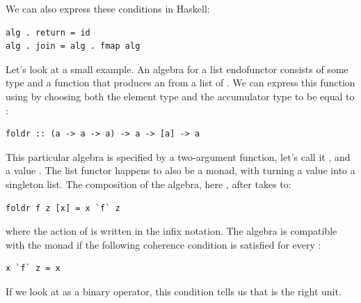 \begin{figure}[H]
  \centering
  \begin{subfigure}
    \centering
  \end{subfigure}
  \hspace{1cm}
  \begin{subfigure}
    \centering
  \end{subfigure}
\end{figure}

\noindent
We can also express these conditions in Haskell:

\begin{Verbatim}
alg . return = id
alg . join = alg . fmap alg
\end{Verbatim}
Let's look at a small example. An algebra for a list endofunctor
consists of some type  and a function that produces an
 from a list of . We can express this function using
 by choosing both the element type and the accumulator
type to be equal to :

\begin{Verbatim}
foldr :: (a -> a -> a) -> a -> [a] -> a
\end{Verbatim}
This particular algebra is specified by a two-argument function, let's
call it , and a value . The list functor happens to
also be a monad, with  turning a value into a singleton
list. The composition of the algebra, here , after
 takes  to:

\begin{Verbatim}
foldr f z [x] = x `f` z
\end{Verbatim}
where the action of  is written in the infix notation. The
algebra is compatible with the monad if the following coherence
condition is satisfied for every :

\begin{Verbatim}
x `f` z = x
\end{Verbatim}
If we look at  as a binary operator, this condition tells us
that  is the right unit.

